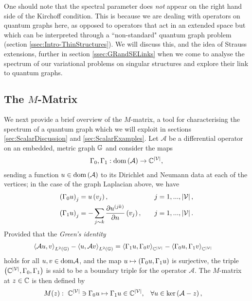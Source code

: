One should note that the spectral parameter does \emph{not} appear on the right hand side of the Kirchoff condition.
This is because we are dealing with operators on quantum graphs here, as opposed to operators that act in an extended space but which can be interpreted through a ``non-standard" quantum graph problem (section \ref{ssec:Intro-ThinStructures}).
We will discuss this, and the idea of Strauss extensions, further in section \ref{ssec:GRandSELinks} when we come to analyse the spectrum of our variational problems on singular structures and explore their link to quantum graphs.

\subsection{The $M$-Matrix} \label{ssec:MMatrix}
We next provide a brief overview of the $M$-matrix, a tool for characterising the spectrum of a quantum graph which we will exploit in sections \ref{sec:ScalarDiscussion} and \ref{sec:ScalarExamples}.
Let $\mathcal{A}$ be a differential operator on an embedded, metric graph $\mathbb{G}$ and consider the maps
\begin{align*}
	\Gamma_0, \Gamma_1: \mathrm{dom}\left( \mathcal{A} \right) \rightarrow \mathbb{C}^{\left\lvert \mathcal{V} \right\rvert},
\end{align*}
sending a function $u\in\mathrm{dom}\left( \mathcal{A} \right)$ to its Dirichlet and Neumann data at each of the vertices; in the case of the graph Laplacian above, we have
\begin{align} \label{eq:GraphDNMapDef}
	\left( \Gamma_0 u \right)_j &= u\left( v_j \right), \quad &j=1,...,\left\lvert \mathcal{V} \right\rvert, \\
	\left( \Gamma_1 u \right)_j &= -\sum_{j\sim k}\dfrac{\partial u^{(jk)}}{\partial n}\left( v_j \right), \quad &j=1,...,\left\lvert \mathcal{V} \right\rvert. 
\end{align}
Provided that the \emph{Green's identity}
\begin{align} \label{eq:GraphGreensIdentity}
	\left\langle \mathcal{A}u , v \right\rangle_{L^2\left( \mathbb{G} \right)} - \left\langle u , \mathcal{A}v \right\rangle_{L^2\left( \mathbb{G} \right)}
	&= \left\langle \Gamma_1 u , \Gamma_0 v \right\rangle_{\mathbb{C}^{\left\lvert \mathcal{V} \right\rvert}} - \left\langle \Gamma_0 u , \Gamma_1 v \right\rangle_{\mathbb{C}^{\left\lvert \mathcal{V} \right\rvert}}
\end{align}
holds for all $u,v\in\mathrm{dom}\mathcal{A}$, and the map $u\mapsto\left( \Gamma_0 u, \Gamma_1 u \right)$ is surjective, the triple $\left( \mathbb{C}^{\left\lvert \mathcal{V} \right\rvert},\Gamma_0,\Gamma_1 \right)$ is said to be a boundary triple for the operator $\mathcal{A}$.
The $M$-matrix at $z\in\mathbb{C}$ is then defined by
\begin{align*}
	M(z): \ \mathbb{C}^{\left\lvert \mathcal{V} \right\rvert} \ni \Gamma_0 u \mapsto \Gamma_1 u \in \mathbb{C}^{\left\lvert \mathcal{V} \right\rvert},
	 &\quad \forall u\in\mathrm{ker}\left( \mathcal{A}-z \right),
\end{align*}
